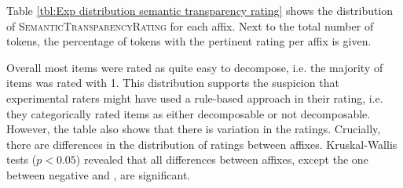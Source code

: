 Table \ref{tbl:Exp distribution semantic transparency rating} shows the distribution of \textsc{SemanticTransparencyRating} for each affix. Next to the total number of tokens, the percentage of tokens with the pertinent rating per affix is given. 


\begin{table}[h!]

	\caption{Semantic Transparency Rating  by affix }
	\label{tbl:Exp distribution semantic transparency rating}
	\begin{center}
	\end{center}
\end{table}

Overall most  items were rated as quite easy to decompose, i.e. the majority of items was rated with 1. This distribution supports the suspicion that experimental raters might have used a rule-based approach in their rating, i.e. they categorically rated items as either decomposable or not decomposable. 
However, the table also shows that there is variation in the ratings. 
Crucially, there are differences in the distribution of ratings between affixes. Kruskal-Wallis tests ($p<0.05$) revealed that all differences between affixes, except the one between negative  and , are significant.

